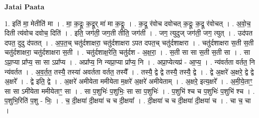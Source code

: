\documentclass[17pt]{extarticle}
\begin{document}
\textbf{Jatai Paata} \newline

1. इति॑ मा॒ मेतीति॑ मा । . मा॒ क॒द्रूः क॒द्रूर् मा॑ मा क॒द्रूः । . क॒द्रू र॑वोच दवोचत् क॒द्रूः क॒द्रू र॑वोचत् । . अ॒वो॒च॒ दिती त्य॑वोच दवोच॒ दिति॑ । . इति॒ जग॑ती॒ जग॒ती तीति॒ जग॑ती । . जग॒ त्युदुज् जग॑ती॒ जग॒ त्युत् । . उद॑पत दपत॒ दुदु द॑पतत् । . अ॒प॒त॒च् चतु॑र्दशाक्षरा॒ चतु॑र्दशाक्षरा ऽपत दपत॒च् चतु॑र्दशाक्षरा । . चतु॑र्दशाक्षरा स॒ती स॒ती चतु॑र्दशाक्षरा॒ चतु॑र्दशाक्षरा स॒ती । . चतु॑र्दशाक्ष॒रेति॒ चतु॑र्दश - अ॒क्ष॒रा॒ । . स॒ती सा सा स॒ती स॒ती सा । . सा ऽप्रा॒प्या प्रा᳚प्य॒ सा सा ऽप्रा᳚प्य । . अप्रा᳚प्य॒ नि न्यप्रा॒प्या प्रा᳚प्य॒ नि । . अप्रा॒प्येत्यप्र॑ - आ॒प्य॒ । . न्य॑वर्तता वर्तत॒ नि न्य॑वर्तत । . अ॒व॒र्त॒त॒ तस्यै॒ तस्या॑ अवर्तता वर्तत॒ तस्यै᳚ । . तस्यै॒ द्वे द्वे तस्यै॒ तस्यै॒ द्वे । . द्वे अ॒क्षरे॑ अ॒क्षरे॒ द्वे द्वे अ॒क्षरे᳚ । . द्वे इति॒ द्वे । . अ॒क्षरे॑ अमीयेता ममीयेता म॒क्षरे॑ अ॒क्षरे॑ अमीयेताम् । . अ॒क्षरे॒ इत्य॒क्षरे᳚ । . अ॒मी॒ये॒ताꣳ॒॒ सा सा ऽमी॑येता ममीयेताꣳ॒॒ सा । . सा प॒शुभिः॑ प॒शुभिः॒ सा सा प॒शुभिः॑ । . प॒शुभि॑ श्च च प॒शुभिः॑ प॒शुभि॑ श्च । . प॒शुभि॒रिति॑ प॒शु - भिः॒ । . च॒ दी॒क्षया॑ दी॒क्षया॑ च च दी॒क्षया᳚ । . दी॒क्षया॑ च च दी॒क्षया॑ दी॒क्षया॑ च । . चा च॒ चा । \newline
\end{document}
